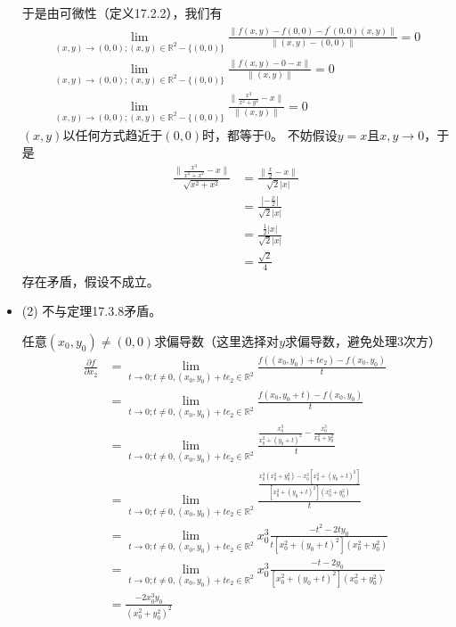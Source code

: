 \documentclass{article}
\begin{document}
\begin{itemize}
        于是由可微性（定义17.2.2），我们有
        \begin{align*}
          \lim\limits_{(x, y) \to (0, 0); (x, y) \in \mathbb{R}^2 - \{(0, 0)\}} \frac{\|f(x, y) - f(0, 0) - f^\prime(0, 0)(x, y)\|}{\|(x, y) - (0, 0)\|} = 0 \\
          \lim\limits_{(x, y) \to (0, 0); (x, y) \in \mathbb{R}^2 - \{(0, 0)\}} \frac{\|f(x, y) - 0 - x\|}{\|(x, y)\|} = 0                                   \\
          \lim\limits_{(x, y) \to (0, 0); (x, y) \in \mathbb{R}^2 - \{(0, 0)\}} \frac{\|\frac{x^3}{x^2 + y^2} - x\|}{\|(x, y)\|} = 0
        \end{align*}
        $(x, y)$以任何方式趋近于$(0, 0)$时，都等于0。
        不妨假设$y = x$且$x, y \to 0$，于是
        \begin{align*}
          \frac{\|\frac{x^3}{x^2 + x^2} - x\|}{\sqrt{x^2 + x^2}}
           & = \frac{\|\frac{x}{2} - x\|}{\sqrt{2}|x|} \\
           & = \frac{|-\frac{x}{2}|}{\sqrt{2}|x|}      \\
           & = \frac{\frac{1}{2}|x|}{\sqrt{2}|x|}      \\
           & = \frac{\sqrt{2}}{4}
        \end{align*}
        存在矛盾，假设不成立。

  \item (2) 不与定理17.3.8矛盾。

        任意$(x_0, y_0) \neq (0, 0)$求偏导数（这里选择对$y$求偏导数，避免处理3次方）
        \begin{align*}
          \frac{\partial f}{\partial x_2}
           & = \lim\limits_{t \to 0; t \neq 0, (x_0, y_0) + te_2 \in \mathbb{R}^2} \frac{f((x_0, y_0) + te_2) - f(x_0, y_0)}{t}                                                             \\
           & = \lim\limits_{t \to 0; t \neq 0, (x_0, y_0) + te_2 \in \mathbb{R}^2} \frac{f(x_0, y_0 + t) - f(x_0, y_0)}{t}                                                                  \\
           & = \lim\limits_{t \to 0; t \neq 0, (x_0, y_0) + te_2 \in \mathbb{R}^2} \frac{\frac{x_0^3}{x_0^2 + (y_0 + t)^2} - \frac{x_0^3}{x_0^2 + y_0^2}}{t}                                \\
           & = \lim\limits_{t \to 0; t \neq 0, (x_0, y_0) + te_2 \in \mathbb{R}^2} \frac{\frac{x_0^3(x_0^2 + y_0^2) - x_0^3[x_0^2 + (y_0 + t)^2]}{[x_0^2 + (y_0 + t)^2](x_0^2 + y_0^2)}}{t} \\
           & = \lim\limits_{t \to 0; t \neq 0, (x_0, y_0) + te_2 \in \mathbb{R}^2} x_0^3 \frac{-t^2 - 2ty_0}{t[x_0^2 + (y_0 + t)^2](x_0^2 + y_0^2)}                                         \\
           & = \lim\limits_{t \to 0; t \neq 0, (x_0, y_0) + te_2 \in \mathbb{R}^2} x_0^3 \frac{-t - 2y_0}{[x_0^2 + (y_0 + t)^2](x_0^2 + y_0^2)}                                             \\
           & = \frac{- 2x_0^3 y_0}{(x_0^2 + y_0^2)^2}
        \end{align*}


\end{itemize}
\end{document}
